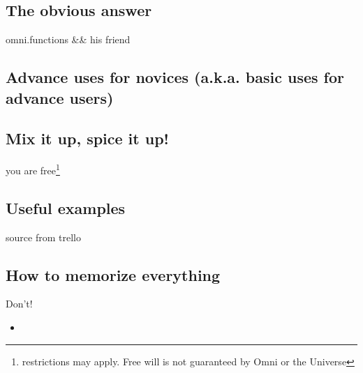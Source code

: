 \subsection{The obvious answer}
omni.functions \&\& his friend 
\subsection{Advance uses for novices (a.k.a. basic uses for advance users)}
\label{sub:basicAdv}
\subsection{Mix it up, spice it up!}
you are free\footnote{restrictions may apply. Free will is not guaranteed by Omni or the Universe}
\subsection{Useful examples}
source from trello
\subsection{How to memorize everything}
Don't!

\begin{itemize}
    \item
\end{itemize}
